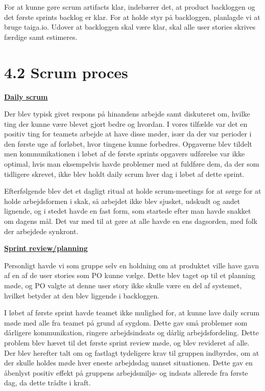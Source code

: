 \documentclass[11pt]{report}
\begin{document}
For at kunne gøre scrum artifacts klar, indebærer det, at product backloggen og det første sprints backlog er klar. For at holde styr på backloggen, planlagde vi at bruge taiga.io. Udover at  backloggen skal være klar, skal alle user stories skrives færdige samt estimeres.

\newpage
\section*{4.2 Scrum proces}
\noindent\underline{\textbf{Daily scrum}}
\par Der blev typisk givet respons på hinandens arbejde samt diskuteret om, hvilke ting der kunne være blevet gjort bedre og hvordan. I vores tilfælde var det en positiv ting for teamets arbejde at have disse møder, især da der var perioder i den første uge af forløbet, hvor tingene kunne forbedres. Opgaverne blev tildelt men kommunikationen i løbet af de første sprints opgavers udførelse var ikke optimal, hvis man eksempelvis havde problemer med at fuldføre dem, da der som tidligere skrevet, ikke blev holdt daily scrum hver dag i løbet af dette sprint.

Efterfølgende blev det et dagligt ritual at holde scrum-meetings for at sørge for at holde arbejdsformen i skak, så arbejdet ikke blev sjusket, udskudt og andet lignende, og i stedet havde en fast form, som startede efter man havde snakket om dagens mål. Det var med til at gøre at alle havde en ens dagsorden, med folk der arbejdede synkront.

\noindent\underline{\textbf{Sprint review/planning}}
\par Personligt havde vi som gruppe selv en holdning om at produktet ville have gavn af en af de user stories som PO kunne vælge. Dette blev taget op til et planning møde, og PO valgte at denne user story ikke skulle være en del af systemet, hvilket betyder at den blev liggende i backloggen.

I løbet af første sprint havde teamet ikke mulighed for, at kunne lave daily scrum møde med alle fra teamet på grund af sygdom. Dette gav små problemer som dårligere kommunikation, ringere arbejdsindsats og dårlig arbejdsfordeling. Dette problem blev hævet til det første sprint review møde, og blev revideret af alle. Der blev herefter talt om og fastlagt tydeligere  krav til gruppen indbyrdes, om at der skulle holdes møde hver eneste arbejdsdag uanset situationen. Dette gav en åbenlyst positiv effekt på gruppens arbejdsmiljø- og indsats allerede fra første dag, da dette trådte i kraft.
\end{document}
